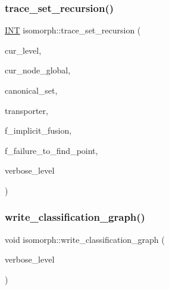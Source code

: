 \subsubsection{\texorpdfstring{trace\+\_\+set\+\_\+recursion()}{trace\_set\_recursion()}}
{\footnotesize\ttfamily \mbox{\hyperlink{galois_8h_a09fddde158a3a20bd2dcadb609de11dc}{I\+NT}} isomorph\+::trace\+\_\+set\+\_\+recursion (\begin{DoxyParamCaption}\item[{\mbox{\hyperlink{galois_8h_a09fddde158a3a20bd2dcadb609de11dc}{I\+NT}}}]{cur\+\_\+level,  }\item[{\mbox{\hyperlink{galois_8h_a09fddde158a3a20bd2dcadb609de11dc}{I\+NT}}}]{cur\+\_\+node\+\_\+global,  }\item[{\mbox{\hyperlink{galois_8h_a09fddde158a3a20bd2dcadb609de11dc}{I\+NT}} $\ast$}]{canonical\+\_\+set,  }\item[{\mbox{\hyperlink{galois_8h_a09fddde158a3a20bd2dcadb609de11dc}{I\+NT}} $\ast$}]{transporter,  }\item[{\mbox{\hyperlink{galois_8h_a09fddde158a3a20bd2dcadb609de11dc}{I\+NT}}}]{f\+\_\+implicit\+\_\+fusion,  }\item[{\mbox{\hyperlink{galois_8h_a09fddde158a3a20bd2dcadb609de11dc}{I\+NT}} \&}]{f\+\_\+failure\+\_\+to\+\_\+find\+\_\+point,  }\item[{\mbox{\hyperlink{galois_8h_a09fddde158a3a20bd2dcadb609de11dc}{I\+NT}}}]{verbose\+\_\+level }\end{DoxyParamCaption})}

\mbox{\label{classisomorph_afcf732909fe6b9f431362fa7c2ade0e5}} 
\subsubsection{\texorpdfstring{write\+\_\+classification\+\_\+graph()}{write\_classification\_graph()}}
{\footnotesize\ttfamily void isomorph\+::write\+\_\+classification\+\_\+graph (\begin{DoxyParamCaption}\item[{\mbox{\hyperlink{galois_8h_a09fddde158a3a20bd2dcadb609de11dc}{I\+NT}}}]{verbose\+\_\+level }\end{DoxyParamCaption})}

\mbox{\label{classisomorph_a1d9175a939d7ae194d582e862b6b0189}} 
